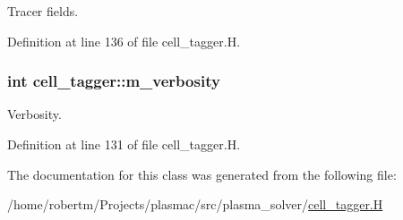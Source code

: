Tracer fields. 



Definition at line 136 of file cell\+\_\+tagger.\+H.

\subsubsection[{\texorpdfstring{m\+\_\+verbosity}{m_verbosity}}]{\setlength{\rightskip}{0pt plus 5cm}int cell\+\_\+tagger\+::m\+\_\+verbosity\hspace{0.3cm}{\ttfamily [protected]}}\hypertarget{classcell__tagger_a0d980aba108e7b024f89d94232657f5e}{}\label{classcell__tagger_a0d980aba108e7b024f89d94232657f5e}


Verbosity. 



Definition at line 131 of file cell\+\_\+tagger.\+H.



The documentation for this class was generated from the following file\+:\begin{DoxyCompactItemize}
\item 
/home/robertm/\+Projects/plasmac/src/plasma\+\_\+solver/\hyperlink{cell__tagger_8H}{cell\+\_\+tagger.\+H}\end{DoxyCompactItemize}
